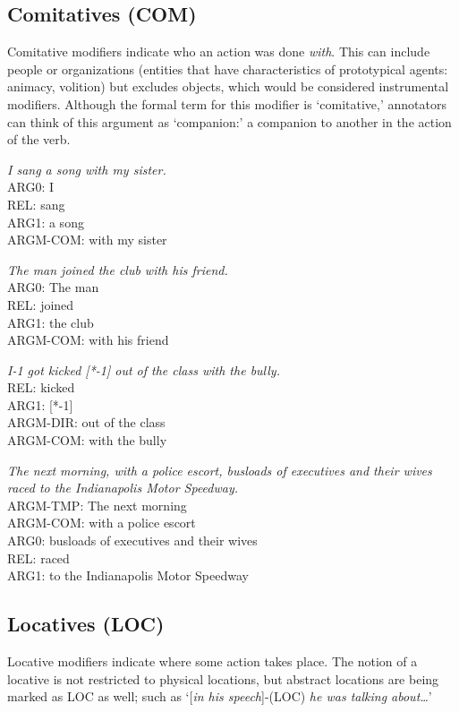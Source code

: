 \documentclass[11pt]{report}
\begin{document}
\subsection{Comitatives (COM)}
\label{ssec: COM}

Comitative modifiers indicate who an action was done \textit{with}.  This can include people or organizations (entities that have characteristics of prototypical agents: animacy, volition) but excludes objects, which would be considered instrumental modifiers.  Although the formal term for this modifier is `comitative,' annotators can think of this argument as `companion:' a companion to another in the action of the verb.

\textit{I sang a song with my sister.}\\
ARG0: I\\
REL: sang\\
ARG1: a song\\
ARGM-COM: with my sister

\textit{The man joined the club with his friend.}\\
ARG0: The man\\
REL: joined\\
ARG1: the club\\
ARGM-COM: with his friend

\textit{I-1 got kicked [*-1] out of the class with the bully.}\\
REL: kicked\\
ARG1: [*-1]\\
ARGM-DIR: out of the class\\
ARGM-COM: with the bully

\textit{The next morning, with a police escort, busloads of executives and their wives raced to the Indianapolis Motor Speedway.}\\
ARGM-TMP:        The next morning \\
ARGM-COM:        with a police escort\\ 
ARG0:        busloads of executives and their wives\\ 
REL:        raced \\
ARG1:        to the Indianapolis Motor Speedway

\subsection{Locatives (LOC)}
\label{ssec: LOC}

Locative modifiers indicate where some action takes place. The notion of a locative is not restricted to physical locations, but abstract locations are being marked as LOC as well; such as `[\textit{in his speech}]-(LOC) \textit{he was talking about\ldots}' 
\end{document}
